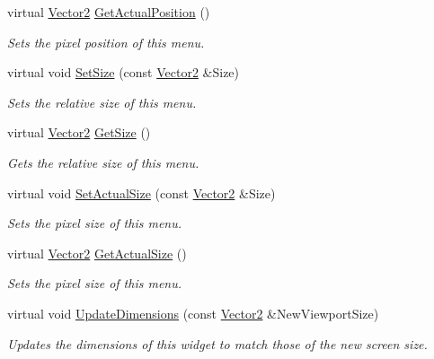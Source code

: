 \begin{DoxyCompactItemize}
virtual \hyperlink{classphys_1_1Vector2}{Vector2} \hyperlink{classphys_1_1UI_1_1Menu_a74a1b8e9b1c5d36c12e5a0a7f813c40a}{GetActualPosition} ()
\begin{DoxyCompactList}\small\item\em Sets the pixel position of this menu. \item\end{DoxyCompactList}\item 
virtual void \hyperlink{classphys_1_1UI_1_1Menu_adef3f9d3351c959f711e929a5e1c8f76}{SetSize} (const \hyperlink{classphys_1_1Vector2}{Vector2} \&Size)
\begin{DoxyCompactList}\small\item\em Sets the relative size of this menu. \item\end{DoxyCompactList}\item 
virtual \hyperlink{classphys_1_1Vector2}{Vector2} \hyperlink{classphys_1_1UI_1_1Menu_a81781199a62bbe7c2e7693ef301223b4}{GetSize} ()
\begin{DoxyCompactList}\small\item\em Gets the relative size of this menu. \item\end{DoxyCompactList}\item 
virtual void \hyperlink{classphys_1_1UI_1_1Menu_acc3fb39539fd3c13def35be54570ae81}{SetActualSize} (const \hyperlink{classphys_1_1Vector2}{Vector2} \&Size)
\begin{DoxyCompactList}\small\item\em Sets the pixel size of this menu. \item\end{DoxyCompactList}\item 
virtual \hyperlink{classphys_1_1Vector2}{Vector2} \hyperlink{classphys_1_1UI_1_1Menu_af7566b83c50a4a02ac78d174d7c61817}{GetActualSize} ()
\begin{DoxyCompactList}\small\item\em Sets the pixel size of this menu. \item\end{DoxyCompactList}\item 
virtual void \hyperlink{classphys_1_1UI_1_1Menu_a60a678cc2be8f3eebfe65b3628557928}{UpdateDimensions} (const \hyperlink{classphys_1_1Vector2}{Vector2} \&NewViewportSize)
\begin{DoxyCompactList}\small\item\em Updates the dimensions of this widget to match those of the new screen size. \item\end{DoxyCompactList}\item 

\end{DoxyCompactItemize}
